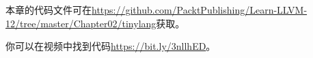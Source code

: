 本章的代码文件可在\url{https://github.com/PacktPublishing/Learn-LLVM-12/tree/master/Chapter02/tinylang}获取。\par

你可以在视频中找到代码\url{https://bit.ly/3nllhED}。\par